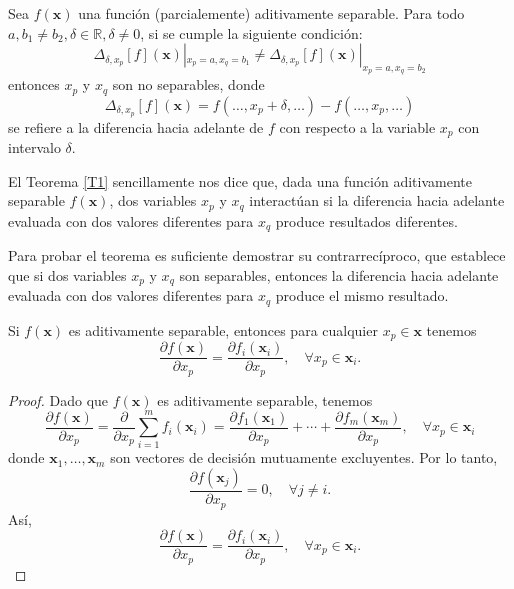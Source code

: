 \begin{teorema}
\label{T1}
Sea \( f(\mathbf{x}) \) una función (parcialemente) aditivamente separable. Para todo \( a, b_1 \neq b_2, \delta \in \mathbb{R}, \delta \neq 0 \), si se cumple la siguiente condición:
\begin{equation}
\Delta_{\delta,x_p}[f](\mathbf{x})|_{x_p=a, x_q=b_1} \neq \Delta_{\delta,x_p}[f](\mathbf{x})|_{x_p=a, x_q=b_2}
\label{EQ6}
\end{equation}
entonces \( x_p \) y \( x_q \) son no separables, donde
\begin{equation}
\Delta_{\delta,x_p}[f](\mathbf{x}) = f(\ldots, x_p + \delta, \ldots) - f(\ldots, x_p, \ldots)
\label{EQ7}
\end{equation}
se refiere a la diferencia hacia adelante de \( f \) con respecto a la variable \( x_p \) con intervalo \( \delta \).
\end{teorema}

El Teorema \ref{T1} sencillamente nos dice que, dada una función aditivamente separable \( f(\mathbf{x}) \), dos variables \( x_p \) y \( x_q \) interactúan si la diferencia hacia adelante evaluada con dos valores diferentes para \( x_q \) produce resultados diferentes.

Para probar el teorema es suficiente demostrar su contrarrecíproco, que establece que si dos variables \( x_p \) y \( x_q \) son separables, entonces la diferencia hacia adelante evaluada con dos valores diferentes para \( x_q \) produce el mismo resultado.

\begin{lema}
\label{L1}
Si \( f(\mathbf{x}) \) es aditivamente separable, entonces para cualquier \( x_p \in \mathbf{x} \) tenemos
\begin{equation}
\frac{\partial f(\mathbf{x})}{\partial x_p} = \frac{\partial f_i(\mathbf{x}_i)}{\partial x_p}, \quad \forall x_p \in \mathbf{x}_i.
\label{EQ8}
\end{equation}
\end{lema}

\begin{proof}
Dado que \( f(\mathbf{x}) \) es aditivamente separable, tenemos
\begin{equation}
\frac{\partial f(\mathbf{x})}{\partial x_p} = \frac{\partial}{\partial x_p} \sum_{i=1}^{m} f_i(\mathbf{x}_i) = \frac{\partial f_1(\mathbf{x}_1)}{\partial x_p} + \cdots + \frac{\partial f_m(\mathbf{x}_m)}{\partial x_p}, \quad \forall x_p \in \mathbf{x}_i
\label{EQ9}
\end{equation}
donde \( \mathbf{x}_1, \ldots, \mathbf{x}_m \) son vectores de decisión mutuamente excluyentes. Por lo tanto,
\begin{equation}
\frac{\partial f(\mathbf{x}_j)}{\partial x_p} = 0, \quad \forall j \neq i.
\label{EQ10}
\end{equation}
Así,
\begin{equation}
\frac{\partial f(\mathbf{x})}{\partial x_p} = \frac{\partial f_i(\mathbf{x}_i)}{\partial x_p}, \quad \forall x_p \in \mathbf{x}_i.
\label{EQ11}
\end{equation}
\end{proof}

